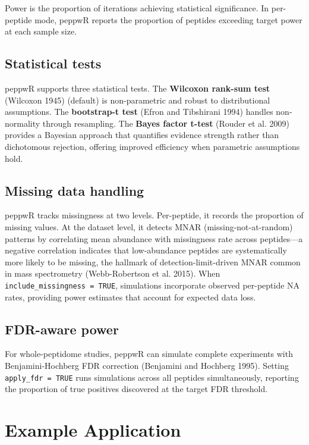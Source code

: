 \documentclass[
]{article}
\begin{document}
Power is the proportion of iterations achieving statistical
significance. In per-peptide mode, peppwR reports the proportion of
peptides exceeding target power at each sample size.

\subsection{Statistical tests}\label{statistical-tests}

peppwR supports three statistical tests. The \textbf{Wilcoxon rank-sum
test} (Wilcoxon 1945) (default) is non-parametric and robust to
distributional assumptions. The \textbf{bootstrap-t test} (Efron and
Tibshirani 1994) handles non-normality through resampling. The
\textbf{Bayes factor t-test} (Rouder et al. 2009) provides a Bayesian
approach that quantifies evidence strength rather than dichotomous
rejection, offering improved efficiency when parametric assumptions
hold.

\subsection{Missing data handling}\label{missing-data-handling}

peppwR tracks missingness at two levels. Per-peptide, it records the
proportion of missing values. At the dataset level, it detects MNAR
(missing-not-at-random) patterns by correlating mean abundance with
missingness rate across peptides---a negative correlation indicates that
low-abundance peptides are systematically more likely to be missing, the
hallmark of detection-limit-driven MNAR common in mass spectrometry
(Webb-Robertson et al. 2015). When
\texttt{include\_missingness\ =\ TRUE}, simulations incorporate observed
per-peptide NA rates, providing power estimates that account for
expected data loss.

\subsection{FDR-aware power}\label{fdr-aware-power}

For whole-peptidome studies, peppwR can simulate complete experiments
with Benjamini-Hochberg FDR correction (Benjamini and Hochberg 1995).
Setting \texttt{apply\_fdr\ =\ TRUE} runs simulations across all
peptides simultaneously, reporting the proportion of true positives
discovered at the target FDR threshold.

\section{Example Application}\label{example-application}
\end{document}
